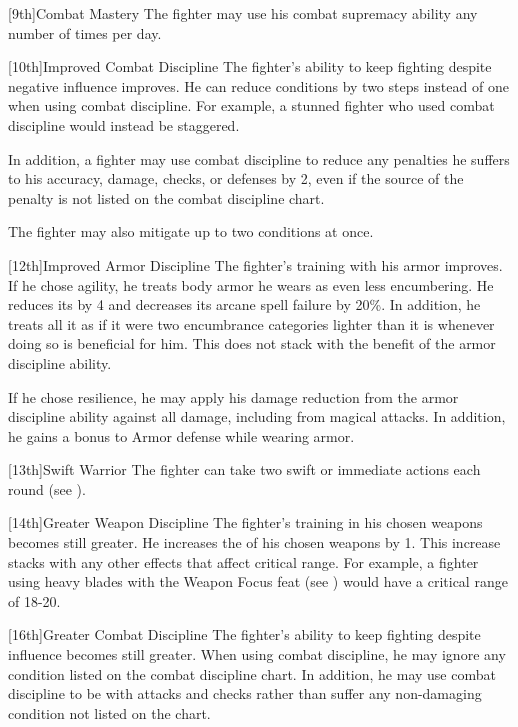        [9th]{Combat Mastery}
        The fighter may use his combat supremacy ability any number of times per day.

        [10th]{Improved Combat Discipline}
        The fighter's ability to keep fighting despite negative influence improves.
        He can reduce conditions by two steps instead of one when using combat discipline.
        For example, a stunned fighter who used combat discipline would instead be staggered.
        \par In addition, a fighter may use combat discipline to reduce any penalties he suffers to his accuracy, damage, checks, or defenses by 2, even if the source of the penalty is not listed on the combat discipline chart.
        \par The fighter may also mitigate up to two conditions at once.

        [12th]{Improved Armor Discipline}
        The fighter's training with his armor improves.
        If he chose agility, he treats body armor he wears as even less encumbering.
        He reduces its  by 4 and decreases its arcane spell failure by 20\%.
        In addition, he treats all it as if it were two encumbrance categories lighter than it is whenever doing so is beneficial for him.
        This does not stack with the benefit of the armor discipline ability.

        If he chose resilience, he may apply his damage reduction from the armor discipline ability against all damage, including from magical attacks.
        In addition, he gains a  bonus to Armor defense while wearing armor.

        [13th]{Swift Warrior}
        The fighter can take two swift or immediate actions each round (see ).

        [14th]{Greater Weapon Discipline}
        The fighter's training in his chosen weapons becomes still greater.
        He increases the  of his chosen weapons by 1.
        This increase stacks with any other effects that affect critical range.
        For example, a fighter using heavy blades with the Weapon Focus feat (see ) would have a critical range of 18-20.

        [16th]{Greater Combat Discipline}
        The fighter's ability to keep fighting despite influence becomes still greater.
        When using combat discipline, he may ignore any condition listed on the combat discipline chart.
        In addition, he may use combat discipline to be \severelyimpaired with attacks and checks rather than suffer any non-damaging condition not listed on the chart.

